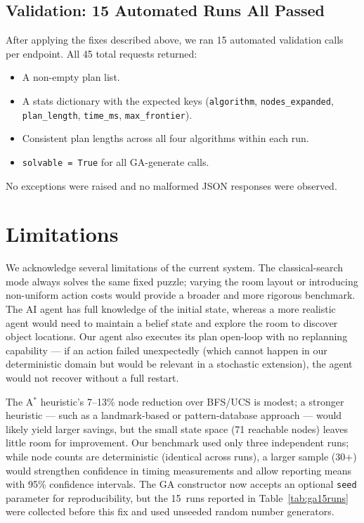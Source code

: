 \documentclass[12pt, a4paper]{report}
\begin{document}
\subsection{Validation: 15 Automated Runs All Passed}

After applying the fixes described above, we ran 15 automated validation calls
per endpoint.  All 45 total requests returned:

\begin{itemize}[leftmargin=1.5em]
  \item A non-empty plan list.
  \item A stats dictionary with the expected keys
        (\texttt{algorithm}, \texttt{nodes\_expanded}, \texttt{plan\_length},
        \texttt{time\_ms}, \texttt{max\_frontier}).
  \item Consistent plan lengths across all four algorithms within each run.
  \item \texttt{solvable = True} for all GA-generate calls.
\end{itemize}

No exceptions were raised and no malformed JSON responses were observed.

\section{Limitations}
\label{sec:limitations}

We acknowledge several limitations of the current system.  The classical-search mode always solves the same fixed puzzle; varying the room layout or introducing non-uniform action costs would provide a broader and more rigorous benchmark.  The AI agent has full knowledge of the initial state, whereas a more realistic agent would need to maintain a belief state and explore the room to discover object locations.  Our agent also executes its plan open-loop with no replanning capability --- if an action failed unexpectedly (which cannot happen in our deterministic domain but would be relevant in a stochastic extension), the agent would not recover without a full restart.

The A$^{\ast}$ heuristic's 7--13\% node reduction over BFS/UCS is modest; a stronger heuristic --- such as a landmark-based or pattern-database approach --- would likely yield larger savings, but the small state space (71 reachable nodes) leaves little room for improvement.  Our benchmark used only three independent runs; while node counts are deterministic (identical across runs), a larger sample (30+) would strengthen confidence in timing measurements and allow reporting means with 95\% confidence intervals.  The GA constructor now accepts an optional \texttt{seed} parameter for reproducibility, but the 15~runs reported in Table~\ref{tab:ga15runs} were collected before this fix and used unseeded random number generators.
\end{document}
